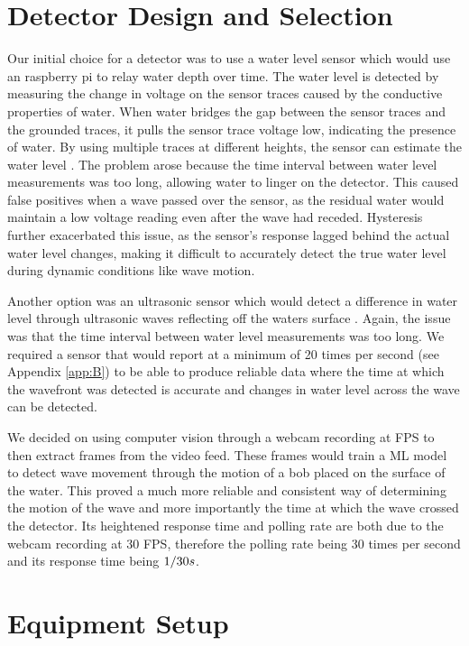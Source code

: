 \section{Detector Design and Selection}
\label{sec:3.1}
Our initial choice for a detector was to use a water level sensor which would use an raspberry pi to relay water depth over time. The water level is detected by measuring the change in voltage on the sensor traces caused by the conductive properties of water. When water bridges the gap between the sensor traces and the grounded traces, it pulls the sensor trace voltage low, indicating the presence of water. By using multiple traces at different heights, the sensor can estimate the water level \cite{noauthor_-depth_2019}\cite{noauthor_water_nodate}. The problem arose because the time interval between water level measurements was too long, allowing water to linger on the detector. This caused false positives when a wave passed over the sensor, as the residual water would maintain a low voltage reading even after the wave had receded. Hysteresis further exacerbated this issue, as the sensor's response lagged behind the actual water level changes, making it difficult to accurately detect the true water level during dynamic conditions like wave motion.

Another option was an ultrasonic sensor which would detect a difference in water level through ultrasonic waves reflecting off the waters surface \cite{noauthor_what_nodate}. Again, the issue was that the time interval between water level measurements was too long. We required a sensor that would report at a minimum of 20 times per second (see Appendix \ref{app:B}) to be able to produce reliable data where the time at which the wavefront was detected is accurate and changes in water level across the wave can be detected. 

We decided on using computer vision through a webcam recording at \ac{FPS} to then extract frames from the video feed. These frames would train a \ac{ML} model to detect wave movement through the motion of a bob placed on the surface of the water. This proved a much more reliable and consistent way of determining the motion of the wave and more importantly the time at which the wave crossed the detector. Its heightened response time and polling rate are both due to the webcam recording at 30 FPS, therefore the polling rate being $30$ times per second and its response time being $1/30 \space s$.

\section{Equipment Setup}

